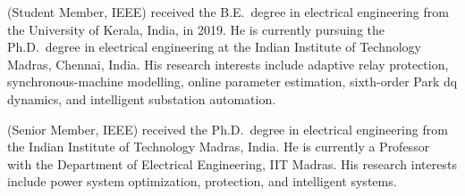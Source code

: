 \documentclass[journal,twoside,letterpaper]{IEEEtran}
\begin{document}
\vfill

(Student Member, IEEE) received the B.E.\ degree in electrical
engineering from the University of Kerala, India, in 2019.
He is currently pursuing the Ph.D.\ degree in electrical engineering
at the Indian Institute of Technology Madras, Chennai, India.
His research interests include adaptive relay protection,
synchronous-machine modelling, online parameter estimation,
sixth-order Park dq dynamics, and intelligent substation automation.

(Senior Member, IEEE) received the Ph.D.\ degree in electrical
engineering from the Indian Institute of Technology Madras, India.
He is currently a Professor with the Department of Electrical
Engineering, IIT Madras. His research interests include power
system optimization, protection, and intelligent systems.
\end{document}
